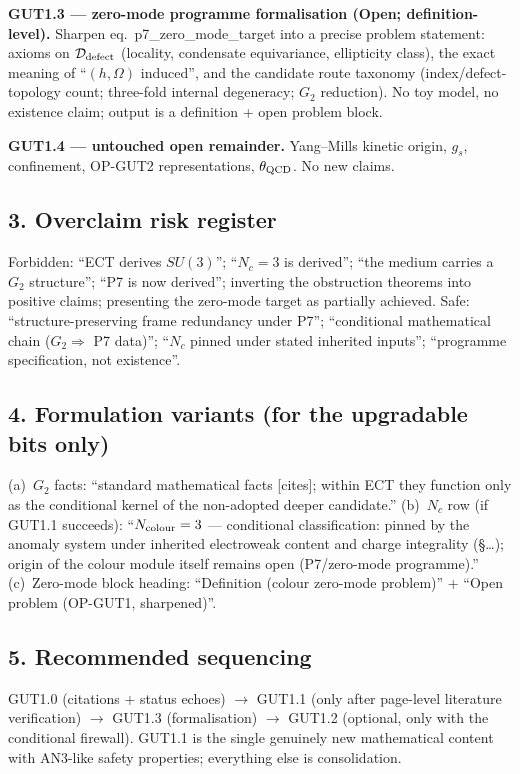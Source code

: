 \textbf{GUT1.3 --- zero-mode programme formalisation (Open;
definition-level).}
Sharpen eq.~p7\_zero\_mode\_target into a precise problem
statement: axioms on $\mathcal D_{\rm defect}$ (locality,
condensate equivariance, ellipticity class), the exact meaning of
``$(h,\Omega)$ induced'', and the candidate route taxonomy
(index/defect-topology count; three-fold internal degeneracy; $G_2$
reduction).
No toy model, no existence claim; output is a definition + open
problem block.

\textbf{GUT1.4 --- untouched open remainder.}
Yang--Mills kinetic origin, $g_s$, confinement, OP-GUT2
representations, $\theta_{\rm QCD}$. No new claims.

\subsection*{3. Overclaim risk register}
Forbidden:
``ECT derives $SU(3)$'';
``$N_c=3$ is derived'';
``the medium carries a $G_2$ structure'';
``P7 is now derived'';
inverting the obstruction theorems into positive claims;
presenting the zero-mode target as partially achieved.
Safe:
``structure-preserving frame redundancy under P7'';
``conditional mathematical chain ($G_2\Rightarrow$ P7 data)'';
``$N_c$ pinned under stated inherited inputs'';
``programme specification, not existence''.

\subsection*{4. Formulation variants (for the upgradable bits only)}
(a)~$G_2$ facts: ``standard mathematical facts
[cites]; within ECT they function only as the conditional kernel of
the non-adopted deeper candidate.''
(b)~$N_c$ row (if GUT1.1 succeeds):
``$N_{\rm colour}=3$ --- conditional classification: pinned by the
anomaly system under inherited electroweak content and charge
integrality (\S\dots); origin of the colour module itself remains
open (P7/zero-mode programme).''
(c)~Zero-mode block heading: ``Definition (colour zero-mode
problem)'' + ``Open problem (OP-GUT1, sharpened)''.

\subsection*{5. Recommended sequencing}
GUT1.0 (citations + status echoes) $\to$ GUT1.1 (only after
page-level literature verification) $\to$ GUT1.3 (formalisation)
$\to$ GUT1.2 (optional, only with the conditional firewall).
GUT1.1 is the single genuinely new mathematical content with
AN3-like safety properties; everything else is consolidation.

